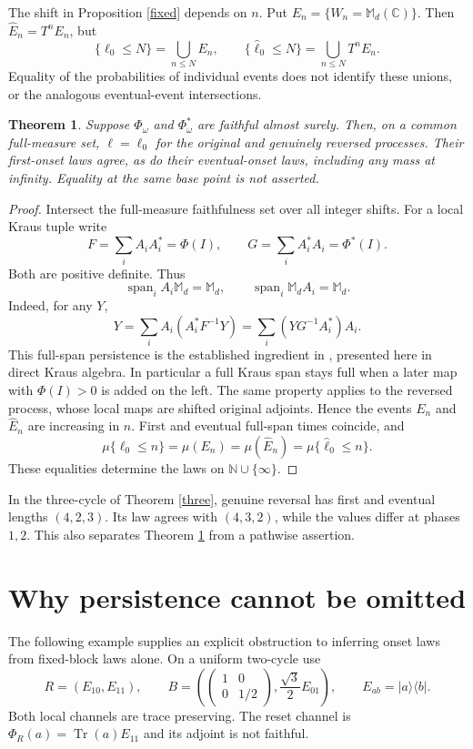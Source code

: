 \documentclass[11pt,a4paper]{article}
\newtheorem{theorem}{Theorem}
\newcommand{\M}{\mathbb M_d(\mathbb C)}
\newcommand{\Span}{\operatorname{span}}
\newcommand{\tr}{\operatorname{Tr}}
\begin{document}
The shift in Proposition \ref{fixed} depends on $n$. Put $E_n=\{W_n=\M\}$. Then
$\widehat E_n=T^nE_n$, but
\[
 \{\ell_0\leq N\}=\bigcup_{n\leq N}E_n,\qquad
 \{\widehat\ell_0\leq N\}=\bigcup_{n\leq N}T^nE_n.
\]
Equality of the probabilities of individual events does not identify these unions, or the analogous eventual-event intersections.

\begin{theorem}\label{law}
Suppose $\Phi_\omega$ and $\Phi_\omega^*$ are faithful almost surely. Then, on a common full-measure set, $\ell=\ell_0$ for the original and genuinely reversed processes. Their first-onset laws agree, as do their eventual-onset laws, including any mass at infinity. Equality at the same base point is not asserted.
\end{theorem}
\begin{proof}
Intersect the full-measure faithfulness set over all integer shifts. For a local Kraus tuple write
\[
 F=\sum_i A_iA_i^*=\Phi(I),\qquad G=\sum_i A_i^*A_i=\Phi^*(I).
\]
Both are positive definite. Thus
\[
 \Span_i A_i\mathbb M_d=\mathbb M_d,\qquad
 \Span_i\mathbb M_dA_i=\mathbb M_d.
\]
Indeed, for any $Y$,
\[
 Y=\sum_i A_i(A_i^*F^{-1}Y)
   =\sum_i(YG^{-1}A_i^*)A_i.
\]
This full-span persistence is the established ingredient in \cite[Lemma A.3]{EMPS}, presented here in direct Kraus algebra. In particular a full Kraus span stays full when a later map with $\Phi(I)>0$ is added on the left. The same property applies to the reversed process, whose local maps are shifted original adjoints. Hence the events $E_n$ and $\widehat E_n$ are increasing in $n$. First and eventual full-span times coincide, and
\[
 \mu\{\ell_0\leq n\}=\mu(E_n)=\mu(\widehat E_n)
 =\mu\{\widehat\ell_0\leq n\}.
\]
These equalities determine the laws on $\mathbb N\cup\{\infty\}$.
\end{proof}

In the three-cycle of Theorem \ref{three}, genuine reversal has first and eventual lengths $(4,2,3)$. Its law agrees with $(4,3,2)$, while the values differ at phases $1,2$. This also separates Theorem \ref{law} from a pathwise assertion.

\section{Why persistence cannot be omitted}
The following example supplies an explicit obstruction to inferring onset laws from fixed-block laws alone. On a uniform two-cycle use
\[
 R=(E_{10},E_{11}),\qquad
 B=\left(\begin{pmatrix}1&0\\0&1/2\end{pmatrix},
                 \frac{\sqrt3}{2}E_{01}\right),
 \qquad E_{ab}=|a\rangle\langle b|.
\]
Both local channels are trace preserving. The reset channel is
$\Phi_R(a)=\tr(a)E_{11}$ and its adjoint is not faithful.
\end{document}
